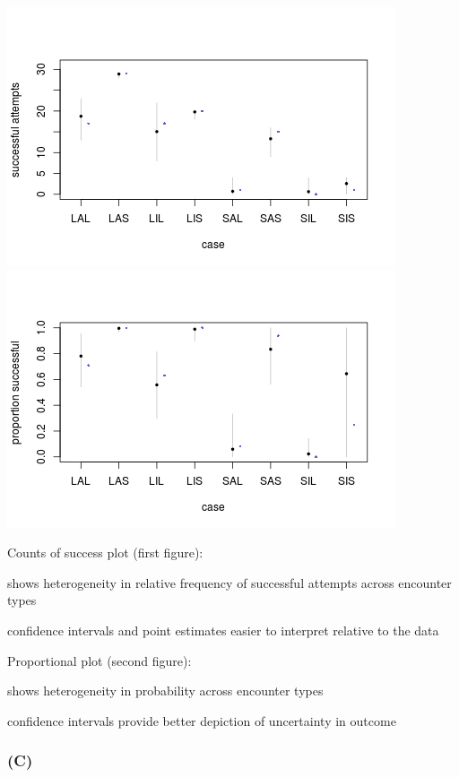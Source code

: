 \documentclass{article}
\makeatletter
\newenvironment{kframe}{%
 \def\FrameCommand##1{\hskip\@totalleftmargin \hskip-\fboxsep
 \colorbox{shadecolor}{##1}\hskip-\fboxsep
     \hskip-\linewidth \hskip-\@totalleftmargin \hskip\columnwidth}%
 \MakeFramed {\advance\hsize-\width
   \@totalleftmargin\z@ \linewidth\hsize
   \@setminipage}}%
 {\par\unskip\endMakeFramed}
\newenvironment{knitrout}{}{} %
\makeatother
\begin{document}
\begin{knitrout}
{\begin{kframe}
\centering{}\includegraphics{pirate-plot-b11} \includegraphics{pirate-plot-b12} 

\end{kframe}}
\end{knitrout}


Counts of success plot (first figure):

shows heterogeneity in relative frequency of successful attempts across encounter types

confidence intervals and point estimates easier to interpret relative to the data

Proportional plot (second figure): 

shows heterogeneity in probability across encounter types

confidence intervals provide better depiction of uncertainty in outcome



\subsubsection*{(C)}
\end{document}
